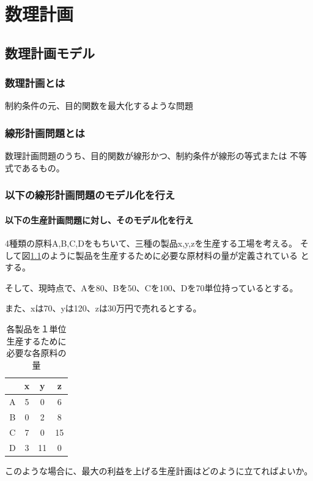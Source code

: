 \documentclass[9pt]{ltjsreport}
\begin{document}
\chapter{数理計画}
\section{数理計画モデル}
\subsection{数理計画とは}
制約条件の元、目的関数を最大化するような問題
\subsection{線形計画問題とは}
数理計画問題のうち、目的関数が線形かつ、制約条件が線形の等式または
不等式であるもの。


\subsection{以下の線形計画問題のモデル化を行え}
\subsubsection{以下の生産計画問題に対し、そのモデル化を行え}
    4種類の原料A,B,C,Dをもちいて、三種の製品x,y,zを生産する工場を考える。
    そして図\ref{tab:productiveplan}のように製品を生産するために必要な原材料の量が定義されている
    とする。

    そして、現時点で、Aを80、Bを50、Cを100、Dを70単位持っているとする。

    また、xは70、yは120、zは30万円で売れるとする。

\begin{table}[h]
    \centering
    \caption[生産計画問題のデータ]{各製品を１単位生産するために必要な各原料の量}
    \label{tab:productiveplan}
    \begin{tabular}{cccc}\toprule
         &x&y&z\\ \midrule
        A&5&0&6\\
        B&0&2&8\\
        C&7&0&15\\
        D&3&11&0\\\bottomrule
    \end{tabular}
\end{table}
    このような場合に、最大の利益を上げる生産計画はどのように立てればよいか。

    \hrulefill
\end{document}
